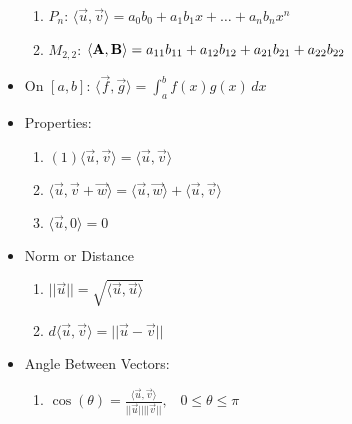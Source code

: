\documentclass[12pt]{article}
\begin{document}
\begin{itemize}
\begin{enumerate}
      \item $P_n$: $\langle\overrightarrow{u},\overrightarrow{v}\rangle=a_0b_0+a_1b_1x+\dots+a_nb_nx^n$

      \item $M_{2,2}$: $\langle\bold{A},\bold{B}\rangle=a_{11}b_{11}+a_{12}b_{12}+a_{21}b_{21}+a_{22}b_{22}$

    \end{enumerate}

  \item On $[a,b]$: $\langle \overrightarrow{f},\overrightarrow{g}\rangle=\int_a^b f(x)g(x)\,dx$

  \item Properties:

    \begin{enumerate}

      \item $(1)\langle\overrightarrow{u},\overrightarrow{v}\rangle=\langle\overrightarrow{u},\overrightarrow{v}\rangle$

      \item $\langle\overrightarrow{u},\overrightarrow{v}+\overrightarrow{w}\rangle=\langle\overrightarrow{u},\overrightarrow{w}\rangle+ \langle\overrightarrow{u},\overrightarrow{v}\rangle$

      \item $\langle\overrightarrow{u},0\rangle=0$

    \end{enumerate}

  \item Norm or Distance

    \begin{enumerate}

      \item $||\overrightarrow{u}||=\sqrt{\langle\overrightarrow{u},\overrightarrow{u}\rangle}$

      \item $d\langle\overrightarrow{u},\overrightarrow{v}\rangle=||\overrightarrow{u}-\overrightarrow{v}||$

    \end{enumerate}

  \item Angle Between Vectors:

    \begin{enumerate}

      \item $\cos(\theta)=\frac{\langle\overrightarrow{u},\overrightarrow{v}\rangle}{||\overrightarrow{u}||||\overrightarrow{v}||},\,\,\,\,\,0\leq\theta\leq\pi$


\end{enumerate}
\end{itemize}
\end{document}
